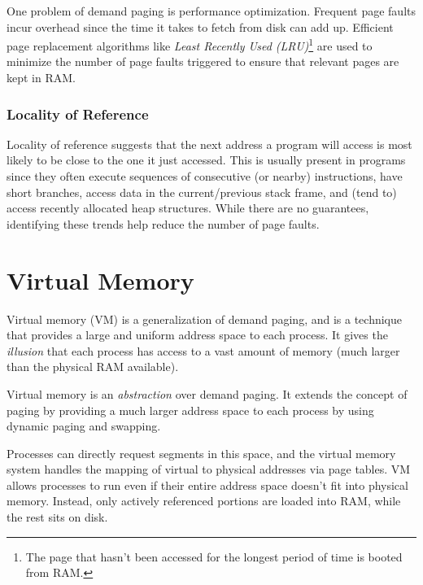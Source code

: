 \documentclass{report}
\newcommand{\abstractionBegin}[1]{\begin{tcolorbox}[colback=violet!5!white,colframe=violet,title={Abstraction:
      #1}]}
\newcommand{\abstractionEnd}{\end{tcolorbox}}
\begin{document}
One problem of demand paging is performance optimization. Frequent page faults incur overhead since
the time it takes to fetch from disk can add up. Efficient page replacement algorithms like
\textit{Least Recently Used (LRU)}\footnote{The page that hasn't been accessed for the longest
  period of time is booted from RAM.} are used to minimize the number of page faults triggered to
ensure that relevant pages are kept in RAM.


\subsection{Locality of Reference}
\label{subsec:LOR}
Locality of reference suggests that the next address a program will access is most likely to be
close to the one it just accessed. This is usually present in programs since they often execute
sequences of consecutive (or nearby) instructions, have short branches, access data in the
current/previous stack frame, and (tend to) access recently allocated heap structures. While there
are no guarantees, identifying these trends help reduce the number of page faults.










\chapter{Virtual Memory}
Virtual memory (VM) is a generalization of demand paging, and is a technique that provides a large
and uniform address space to each process. It gives the \textit{illusion} that each process has
access to a vast amount of memory (much larger than the physical RAM available).

\abstractionBegin{Virtual Memory and Paging}
Virtual memory is an \textit{abstraction} over demand paging. It extends the concept of paging by
providing a much larger address space to each process by using dynamic paging and swapping.
\abstractionEnd

Processes can directly request segments in this space, and the virtual memory system handles the
mapping of virtual to physical addresses via page tables. VM allows processes to run even if their
entire address space doesn't fit into physical memory. Instead, only actively referenced portions
are loaded into RAM, while the rest sits on disk.
\end{document}
